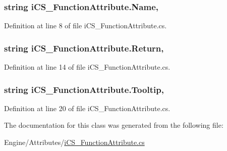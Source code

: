 \hypertarget{classi_c_s___function_attribute_a2a4f0d0b295552f352c195b8b982b11f}{
\subsubsection[{Name}]{\setlength{\rightskip}{0pt plus 5cm}string i\+C\+S\+\_\+\+Function\+Attribute.\+Name\hspace{0.3cm}{\ttfamily [get]}, {\ttfamily [set]}}}\label{classi_c_s___function_attribute_a2a4f0d0b295552f352c195b8b982b11f}


Definition at line 8 of file i\+C\+S\+\_\+\+Function\+Attribute.\+cs.

\hypertarget{classi_c_s___function_attribute_aa1b602631e8160d609345a7bf0b3218a}{
\subsubsection[{Return}]{\setlength{\rightskip}{0pt plus 5cm}string i\+C\+S\+\_\+\+Function\+Attribute.\+Return\hspace{0.3cm}{\ttfamily [get]}, {\ttfamily [set]}}}\label{classi_c_s___function_attribute_aa1b602631e8160d609345a7bf0b3218a}


Definition at line 14 of file i\+C\+S\+\_\+\+Function\+Attribute.\+cs.

\hypertarget{classi_c_s___function_attribute_a2fb44497a84434daa682de0deb64378d}{
\subsubsection[{Tooltip}]{\setlength{\rightskip}{0pt plus 5cm}string i\+C\+S\+\_\+\+Function\+Attribute.\+Tooltip\hspace{0.3cm}{\ttfamily [get]}, {\ttfamily [set]}}}\label{classi_c_s___function_attribute_a2fb44497a84434daa682de0deb64378d}


Definition at line 20 of file i\+C\+S\+\_\+\+Function\+Attribute.\+cs.



The documentation for this class was generated from the following file\+:\begin{DoxyCompactItemize}
\item 
Engine/\+Attributes/\hyperlink{i_c_s___function_attribute_8cs}{i\+C\+S\+\_\+\+Function\+Attribute.\+cs}\end{DoxyCompactItemize}
